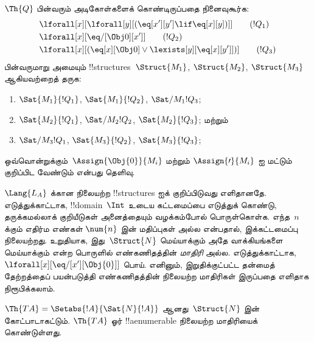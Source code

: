 \documentclass[../../../include/open-logic-section]{subfiles}
\begin{document}
\begin{prob}
$\Th{Q}$ பின்வரும் அடிகோள்களைக் கொண்டிருப்பதை நினைவுகூர்க:
\begin{align*}
& \lforall[x][\lforall[y][(\eq[x'][y'] \lif \eq[x][y])]] \tag{$!Q_1$}\\
& \lforall[x][\eq/[\Obj 0][x']] \tag{$!Q_2$}\\
& \lforall[x][(\eq[x][\Obj 0] \lor \lexists[y][\eq[x][y']])] \tag{$!Q_3$}
\end{align*}
பின்வருமாறு அமையும் !!{structure}s~$\Struct{M_1}$, $\Struct{M_2}$,
$\Struct{M_3}$ ஆகியவற்றைத் தருக:
\begin{enumerate}
\item $\Sat{M_1}{!Q_1}$, $\Sat{M_1}{!Q_2}$, $\Sat/{M_1}{!Q_3}$;
\item $\Sat{M_2}{!Q_1}$, $\Sat/{M_2}{!Q_2}$, $\Sat{M_2}{!Q_3}$; மற்றும்
\item $\Sat/{M_3}{!Q_1}$, $\Sat{M_3}{!Q_2}$, $\Sat{M_3}{!Q_3}$;
\end{enumerate}
ஒவ்வொன்றுக்கும்~$\Assign{\Obj{0}}{M_i}$ மற்றும்
$\Assign{\prime}{M_i}$ ஐ மட்டும் குறிப்பிட வேண்டும் என்பது தெளிவு.
\end{prob}

\begin{explain}
$\Lang{L_A}$ க்கான நிலையற்ற !!{structure}s ஐக் குறிப்பிடுவது
எளிதானதே. எடுத்துக்காட்டாக, !!{domain}~$\Int$ உடைய கட்டமைப்பை எடுத்துக்
கொண்டு, தருக்கமல்லாக் குறியீடுகள் அனைத்தையும் வழக்கம்போல் பொருள்கொள்க.
எந்த~$n$ க்கும் எதிர்ம எண்கள் $\num{n}$ இன் மதிப்புகள் அல்ல என்பதால்,
இக்கட்டமைப்பு நிலையற்றது. உறுதியாக, இது~$\Struct{N}$ மெய்யாக்கும்
அதே வாக்கியங்களை மெய்யாக்கும் என்ற பொருளில் எண்கணிதத்தின்
\emph{மாதிரி} அல்ல. எடுத்துக்காட்டாக,
$\lforall[x][\eq/[x'][\Obj{0}]]$ பொய். எனினும், இறுதிக்குட்பட்ட
தன்மைத் தேற்றத்தைப் பயன்படுத்தி எண்கணிதத்தின் நிலையற்ற மாதிரிகள்
இருப்பதை எளிதாக நிரூபிக்கலாம்.
\end{explain}

\begin{prop}
$\Th{TA} = \Setabs{!A}{\Sat{N}{!A}}$ ஆனது~$\Struct{N}$ இன்
கோட்பாடாகட்டும். $\Th{TA}$ ஓர் !!a{enumerable} நிலையற்ற மாதிரியைக்
கொண்டுள்ளது.
\end{prop}
\end{document}
